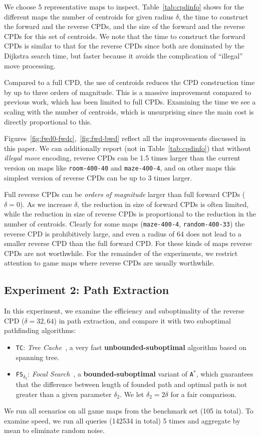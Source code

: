 We choose 5 representative maps to inspect. Table~\ref{tab:cpdinfo} shows
for the different maps the number of centroids for given radius $\delta$,
the time to construct the forward and the reverse CPDs, and the size of the
forward and the reverse CPDs for this set of centroids.
We note that the time to construct the forward CPDs is similar to that
for the reverse CPDs since both are dominated by the Dijkstra
search time, but faster because it avoids the complication of
``illegal'' move processing.

Compared to a full CPD, the use of centroids reduces the CPD construction time by up to three orders
of magnitude. This is a massive improvement compared to previous work, which has been limited to 
full CPDs.
%
Examining the time we see a scaling with the number of centroids, which
is unsurprising since the main cost is directly proportional to this.

Figures~\ref{fig:fwd0-fwdc},~\ref{fig:fwd-bwd} reflect all the improvements  discussed in this paper. 
We can additionally report (not in Table~\ref{tab:cpdinfo}) that 
without \textit{illegal move} encoding, reverse CPDs can be 1.5 times 
larger than the current version on maps like
\texttt{room-400-40} and \texttt{maze-400-4}, and on other maps 
this simplest version of reverse CPDs can be up to 3 times larger.

Full reverse CPDs can be \emph{orders of magnitude} larger than full forward CPDs
($\delta = 0$). As we increase $\delta$, the reduction in size of forward CPDs is often limited, while the
reduction in size of reverse CPDs is proportional to
the reduction in the number of centroids. Clearly for some maps (\texttt{maze-400-4},
\texttt{random-400-33}) the reverse CPD is prohibitively large, and even a
radius of 64 does not lead to a smaller reverse CPD than the full forward
CPD. For these kinds of maps reverse CPDs are not worthwhile.  For the
remainder of the experiments, we restrict attention to game maps where
reverse CPDs are usually worthwhile.


\subsection{Experiment 2: Path Extraction}
In this experiment, we examine the efficiency and suboptimality 
of the reverse CPD ($\delta=32,64$) in path extraction, 
and compare it with two suboptimal pathfinding algorithms:
\begin{itemize}
    \item {\tt TC}: \textit{Tree Cache}~\cite{k-tc-12},
    a very fast \textbf{unbounded-suboptimal} algorithm based on spanning tree.
    \item {\tt FS$_{\delta_2}$}: \textit{Focal Search}~\cite{DBLP:journals/pami/PearlK82},
    a \textbf{bounded-suboptimal} variant of {\tt A$^*$},
    which guarantees that the difference between length of founded path and optimal path is not greater than a given parameter $\delta_2$. We let $\delta_2 = 2 \delta$ for a fair comparison.
\end{itemize}
We run all scenarios on all game maps from the benchmark set (105 in total).
To examine speed, we run all queries (142534 in total) 5 times and aggregate by mean 
to eliminate random noise.

